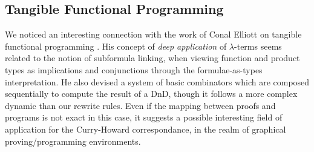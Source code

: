 
\subsection*{Tangible Functional Programming}

We noticed an interesting connection with the work of Conal Elliott on
tangible functional programming . His concept
of \emph{deep application} of $\lambda$-terms seems related to the
notion of subformula linking, when viewing function and product types
as implications and conjunctions through the formulae-as-types
interpretation. He also devised a system of basic combinators which
are composed sequentially to compute the result of a DnD, though it
follows a more complex dynamic than our rewrite rules. Even if the
mapping between proofs and programs is not exact in this case, it
suggests a possible interesting field of application for the
Curry-Howard correspondance, in the realm of graphical
proving/programming environments.